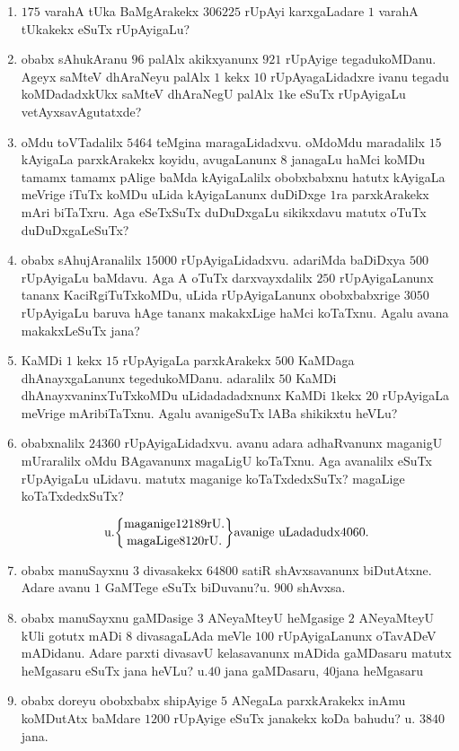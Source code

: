 \begin{enumerate}[\rm(1)]
\item $175$ varahA tUka BaMgArakekx $306225$ rUpAyi karxgaLadare $1$ varahA tUkakekx eSuTx rUpAyigaLu?
\item obabx sAhukAranu $96$ palAlx akikxyanunx $921$ rUpAyige tegadukoMDanu. Ageyx saMteV dhAraNeyu palAlx $1$ kekx $10$ rUpAyagaLidadxre ivanu tegadu koMDadadxkUkx saMteV dhAraNegU palAlx $1$ke eSuTx rUpAyigaLu vetAyxsavAgutatxde?
\item oMdu toVTadalilx $5464$ teMgina maragaLidadxvu. oMdoMdu maradalilx $15$ kAyigaLa parxkArakekx koyidu, avugaLanunx $8$ janagaLu haMci koMDu tamamx tamamx pAlige baMda kAyigaLalilx obobxbabxnu hatutx kAyigaLa meVrige iTuTx koMDu uLida kAyigaLanunx duDiDxge $1$ra parxkArakekx mAri biTaTxru. Aga eSeTxSuTx duDuDxgaLu sikikxdavu matutx oTuTx duDuDxgaLeSuTx?
\item obabx sAhujAranalilx $15000$ rUpAyigaLidadxvu. adariMda baDiDxya $500$ rUpAyigaLu baMdavu. Aga A oTuTx darxvayxdalilx $250$ rUpAyigaLanunx tananx KaciRgiTuTxkoMDu, uLida rUpAyigaLanunx obobxbabxrige $3050$ rUpAyigaLu baruva hAge tananx makakxLige haMci koTaTxnu. Agalu avana makakxLeSuTx jana?
\item KaMDi $1$ kekx $15$ rUpAyigaLa parxkArakekx $500$ KaMDaga dhAnayxgaLanunx tegedukoMDanu. adaralilx $50$ KaMDi dhAnayxvaninxTuTxkoMDu uLidadadadxnunx KaMDi $1$kekx $20$ rUpAyigaLa meVrige mAribiTaTxnu. Agalu avanigeSuTx lABa shikikxtu heVLu?
\item obabxnalilx $24360$ rUpAyigaLidadxvu. avanu adara adhaRvanunx maganigU mUraralilx oMdu BAgavanunx magaLigU koTaTxnu. Aga avanalilx eSuTx rUpAyigaLu uLidavu. matutx maganige koTaTxdedxSuTx? magaLige koTaTxdedxSuTx?

\begin{equation*}
\text{u.}\chssk{\text{maganige} 12189 \text{rU.}} {\text{magaLige} 8120 \text{rU.}} \text{avanige uLadadudx} 4060.
\end{equation*}

\item obabx manuSayxnu $3$ divasakekx $64800$ satiR shAvxsavanunx biDutAtxne. Adare avanu $1$ GaMTege eSuTx biDuvanu?\hfill u. $900$ shAvxsa.
\item obabx manuSayxnu gaMDasige $3$ ANeyaMteyU heMgasige $2$ ANeyaMteyU kUli gotutx mADi $8$ divasagaLAda meVle $100$ rUpAyigaLanunx oTavADeV mADidanu. Adare parxti divasavU kelasavanunx mADida gaMDasaru matutx heMgasaru eSuTx jana heVLu? \hfill u.$40$ jana gaMDasaru, $40$jana heMgasaru
\item obabx doreyu obobxbabx shipAyige $5$ ANegaLa parxkArakekx inAmu koMDutAtx baMdare $1200$ rUpAyige eSuTx janakekx koDa bahudu? \hfill u. $3840$ jana.


\end{enumerate}
